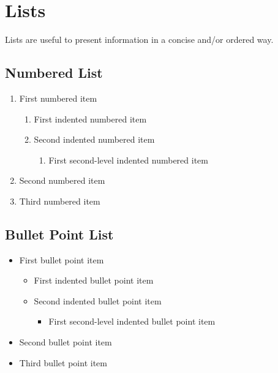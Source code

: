 \documentclass[
	11pt, %
	fleqn, %
	a4paper, %
]{LegrandOrangeBook}
\begin{document}

\section{Lists}

Lists are useful to present information in a concise and/or ordered way.

\subsection{Numbered List}

\begin{enumerate}
	\item First numbered item
	      \begin{enumerate}
		      \item First indented numbered item
		      \item Second indented numbered item
		            \begin{enumerate}
			            \item First second-level indented numbered item
		            \end{enumerate}
	      \end{enumerate}
	\item Second numbered item
	\item Third numbered item
\end{enumerate}

\subsection{Bullet Point List}

\begin{itemize}
	\item First bullet point item
	      \begin{itemize}
		      \item First indented bullet point item
		      \item Second indented bullet point item
		            \begin{itemize}
			            \item First second-level indented bullet point item
		            \end{itemize}
	      \end{itemize}
	\item Second bullet point item
	\item Third bullet point item
\end{itemize}
\end{document}
